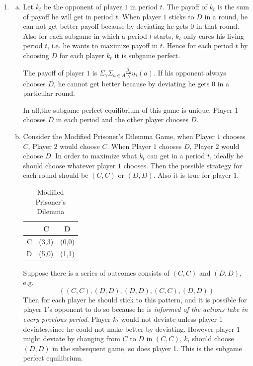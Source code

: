 \documentclass[a4paper,12pt]{article}
\begin{document}
\begin{enumerate}
\item
\begin{enumerate}[a.]
\item
Let $k_t$ be the opponent of player $1$ in period $t$.
The payoff of $k_t$ is the sum of payoff he will get in period $t$.
When player $1$ sticks to $D$ in a round,
he can not get better payoff because by deviating he gets 0 in that round.
Also for each subgame in which a period $t$ starts,
$k_t$ only cares his living period $t$, i.e. he wants to maximize payoff in $t$.
Hence for each period $t$ by choosing $D$ for each player $k_t$ it is subgame perfect.

The payoff of player $1$ is $\Sigma_{\gamma}\Sigma_{a\in A}\frac{\beta_a}{\gamma}u_i(a)$.
If his opponent always chooses $D$, 
he cannot get better because by deviating he gets 0 in a particular round.

In all,the subgame perfect equilibrium of this game is unique. Player $1$ chooses $D$ in
each period and the other player chooses $D$.

\item
Consider the Modified Prisoner's Dilemma Game, when Player $1$ chooses $C$,
Player $2$ would choose $C$.
When Player $1$ chooses $D$, Player $2$ would choose $D$.
In order to maximize what $k_t$ can get in a period $t$,
ideally he should choose whatever player $1$ chooses.
Then the possible strategy for each round should be $(C,C)$ or $(D,D)$.
Also it is true for player $1$.

\begin{table}[!ht]
\centering
    \begin{tabular}{|c|c|c|}
    \hline
      & C     & D     \\\hline
    C & (3,3) & (0,0) \\\hline
    D & (5,0) & (1,1) \\\hline
    \end{tabular}
    \caption{Modified Prisoner's Dilemma}
\end{table}

Suppose there is a series of outcomes consists of $(C,C)$ and $(D,D)$,
e.g. 
\begin{displaymath}
((C,C),(D,D),(D,D),(C,C),(D,D))	
\end{displaymath}
Then for each player he should stick to this pattern,
and it is possible for player $1'$s opponent to do so because he is \textit{informed of the actions take in every previous period}.
Player $k_t$ would not deviate unless player 1 deviates,since he could not make better by deviating.
However player 1 might deviate by changing from $C$ to $D$ in $(C,C)$,
$k_t$ should choose $(D,D)$ in the subsequent game, so does player 1.
This is the subgame perfect equilibrium.


\end{enumerate}
\end{enumerate}
\end{document}
